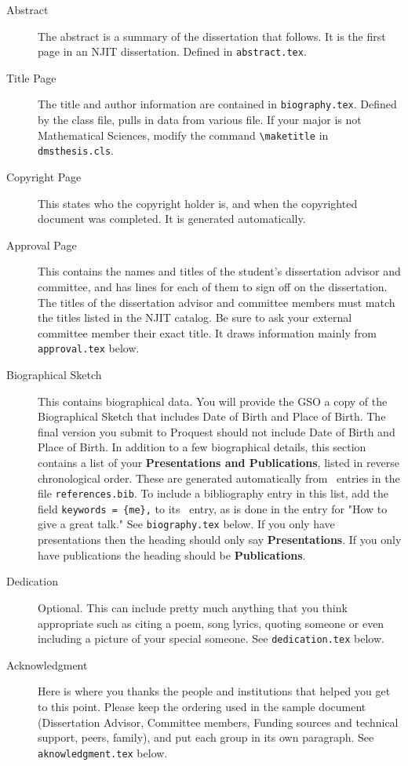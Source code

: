 \begin{description}
\item [Abstract] The abstract is a summary of the dissertation that follows. It is the first page in an NJIT dissertation. Defined in \texttt{abstract.tex}.
%
\item [Title Page]The title and author information are contained in \texttt{biography.tex}.  Defined by the class file, pulls in data from various file. If your major is not Mathematical Sciences, modify the command \verb#\maketitle# in \texttt{dmsthesis.cls}.
%
\item [Copyright Page] This states who the copyright holder is, and when the copyrighted document was completed. It is generated automatically.
%
\item [Approval Page] This contains the names and titles of the student's dissertation advisor and committee, and has lines for each of them to sign off on the dissertation. The titles of the dissertation advisor and committee members must match the titles listed in the NJIT catalog. Be sure to ask your external committee member their exact title.  It draws information mainly from \texttt{approval.tex} below.
\item [Biographical Sketch] This contains biographical data. You will provide the GSO a copy of the Biographical Sketch that includes Date of Birth and Place of Birth. The final version you submit to Proquest should not include Date of Birth and Place of Birth. In addition to a few biographical details, this section contains a list of your {\bf Presentations and Publications}, listed in reverse chronological order. These are generated automatically from \BibTeX\ entries in the file \texttt{references.bib}. To include a bibliography entry in this list, add the field \verb+keywords = {me},+ to its \BibTeX\ entry, as is done in the entry for "How to give a great talk." See \texttt{biography.tex} below. If you only have presentations then the heading should only say {\bf Presentations}. If you only have publications the heading should be {\bf Publications}.
%
\item [Dedication] Optional. This can include pretty much anything that you think appropriate such as citing a poem, song lyrics, quoting someone or even including a picture of your special someone. See \texttt{dedication.tex} below.
%
\item [Acknowledgment] Here is where you thanks the people and institutions that helped you get to this point. Please keep the ordering used in the sample document (Dissertation Advisor, Committee members, Funding sources and technical support, peers, family), and put each group in its own paragraph. See \texttt{aknowledgment.tex} below.

\end{description}
